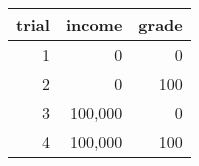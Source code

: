 \begin{tabular}{rrr}
trial &  income &  grade\\ 
\hline
 1 &  0 &  0\\ 
2 &  0 &  100\\ 
3 &  100,000 &  0\\ 
4 &  100,000 &  100\\ 
\end{tabular}
\newcommand\Gzero{62.362}\newcommand\Gone{0.00082833}